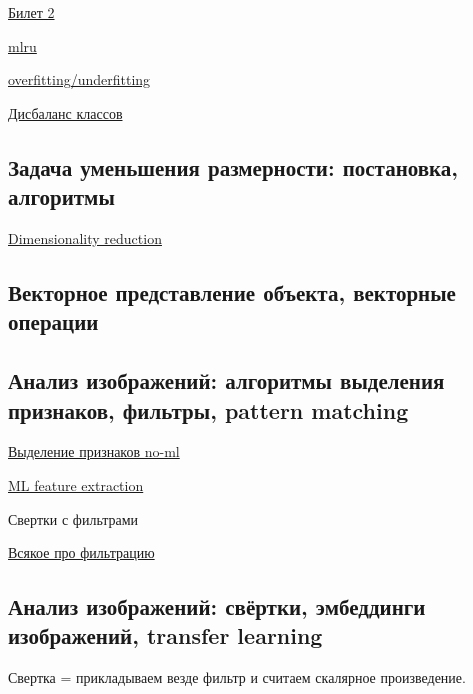 \documentclass{article}
\begin{document}
\hyperref[sec:supervised_learning]{Билет 2}

\href{
	http://www.machinelearning.ru/wiki/index.php?title=%
}{mlru}

\href{
	https://neerc.ifmo.ru/wiki/index.php?title=%
}{overfitting/underfitting}

\href{
	https://machinelearningmastery.ru/tactics-to-combat-imbalanced-classes-in-your-machine-learning-dataset/
}{Дисбаланс классов}


\subsection{Задача уменьшения размерности: постановка, алгоритмы}

\hyperref[sec:dim_reduction]{Dimensionality reduction}


\subsection{Векторное представление объекта, векторные операции}


\subsection{Анализ изображений: алгоритмы выделения признаков, фильтры, pattern
matching}

\href{
	https://ru.wikipedia.org/wiki/%
}{Выделение признаков no-ml}

\href{
	https://en.wikipedia.org/wiki/Template_matching#Feature-based_approach
}{ML feature extraction}

Свертки с фильтрами

\href{
	https://habr.com/ru/post/208090/
}{Всякое про фильтрацию}


\subsection{Анализ изображений: свёртки, эмбеддинги изображений, transfer learning}

Свертка = прикладываем везде фильтр и считаем скалярное произведение.
\end{document}
